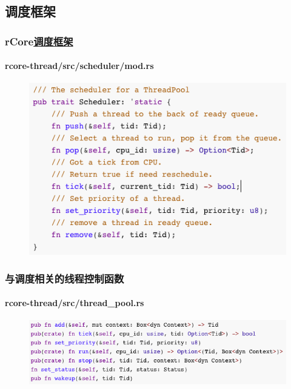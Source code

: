 \subsection{调度框架} %
\begin{frame}[fragile]
    \frametitle{rCore\href{https://github.com/rcore-os/rcore-thread/tree/master/src/scheduler}{调度框架}}
    \framesubtitle{rcore-thread/src/scheduler/mod.rs}
    \begin{figure}
    \includegraphics[width=0.65\linewidth]{figs/Scheduler.png}
    \end{figure}
\end{frame}
% 
% 
% 
% 
\begin{frame}[fragile]
    \frametitle{与调度相关的线程控制函数}
    \framesubtitle{rcore-thread/src/thread\_pool.rs}
    \begin{figure}
    \includegraphics[width=1.0\linewidth]{figs/thread-pool-scheduler.png}
    \end{figure}
\end{frame}
